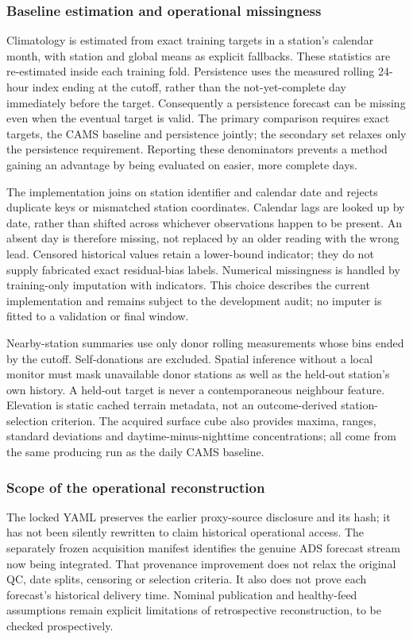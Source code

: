 \subsubsection{Baseline estimation and operational missingness}
Climatology is estimated from exact training targets in a station's calendar
month, with station and global means as explicit fallbacks. These statistics
are re-estimated inside each training fold. Persistence uses the measured
rolling 24-hour index ending at the cutoff, rather than the not-yet-complete
day immediately before the target. Consequently a persistence forecast can
be missing even when the eventual target is valid. The primary comparison
requires exact targets, the CAMS baseline and persistence jointly; the
secondary set relaxes only the persistence requirement. Reporting these
denominators prevents a method gaining an advantage by being evaluated on
easier, more complete days.

The implementation joins on station identifier and calendar date and rejects
duplicate keys or mismatched station coordinates. Calendar lags are looked up
by date, rather than shifted across whichever observations happen to be
present. An absent day is therefore missing, not replaced by an older reading
with the wrong lead. Censored historical values retain a lower-bound indicator;
they do not supply fabricated exact residual-bias labels. Numerical missingness
is handled by training-only imputation with indicators. This choice describes
the current implementation and remains subject to the development audit;
no imputer is fitted to a validation or final window.

Nearby-station summaries use only donor rolling measurements whose bins
ended by the cutoff. Self-donations are excluded. Spatial inference without
a local monitor must mask unavailable donor stations as well as the held-out
station's own history. A held-out target is never a contemporaneous neighbour
feature. Elevation is static cached terrain metadata, not an outcome-derived
station-selection criterion. The acquired surface cube also provides maxima,
ranges, standard deviations and daytime-minus-nighttime concentrations; all
come from the same producing run as the daily CAMS baseline.

\subsubsection{Scope of the operational reconstruction}
The locked YAML preserves the earlier proxy-source disclosure and its hash;
it has not been silently rewritten to claim historical operational access.
The separately frozen acquisition manifest identifies the genuine ADS
forecast stream now being integrated. That provenance improvement does not
relax the original QC, date splits, censoring or selection criteria. It also
does not prove each forecast's historical delivery time. Nominal publication
and healthy-feed assumptions remain explicit limitations of retrospective
reconstruction, to be checked prospectively.

